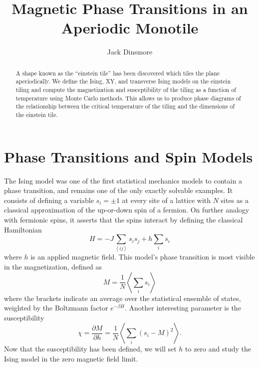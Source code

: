 \documentclass[amsmath,amssymb,aps,twocolumn]{revtex4-2}
\newcommand{\braket}[1]{\left \langle #1 \right \rangle}
\begin{document}
\title{Magnetic Phase Transitions in an Aperiodic Monotile}
\author{Jack Dinsmore}

\begin{abstract}
  A shape known as the ``einstein tile'' has been discovered which tiles the plane aperiodically. We define the Ising, XY, and transverse Ising models on the einstein tiling and compute the magnetization and susceptibility of the tiling as a function of temperature using Monte Carlo methods. This allows us to produce phase diagrams of the relationship between the critical temperature of the tiling and the dimensions of the einstein tile.
\end{abstract}

\maketitle

\section{Phase Transitions and Spin Models}
The Ising model was one of the first statistical mechanics models to contain a phase transition, and remains one of the only exactly solvable examples. It consists of defining a variable $s_i = \pm 1$ at every site of a lattice with $N$ sites as a classical approximation of the up-or-down spin of a fermion. On further analogy with fermionic spins, it asserts that the spins interact by defining the classical Hamiltonian
\begin{equation}
  H = -J \sum_{\braket{ij}} s_i s_j + h \sum_i s_i
  \label{eqn:ising}
\end{equation}
where $h$ is an applied magnetic field. This model's phase transition is most visible in the magnetization, defined as
\begin{equation}
  M = \frac{1}{N}\braket{\sum_{i} s_i}
  \label{eqn:magnetization}
\end{equation}
where the brackets indicate an average over the statistical ensemble of states, weighted by the Boltzmann factor $e^{-\beta H}$. Another interesting parameter is the susceptibility
\begin{equation}
  \chi = \frac{\partial M}{\partial h} = \frac{1}{N} \braket{\sum_{i} (s_i - M)^2}.
\end{equation}
Now that the susceptibility has been defined, we will set $h$ to zero and study the Ising model in the zero magnetic field limit.
\end{document}
